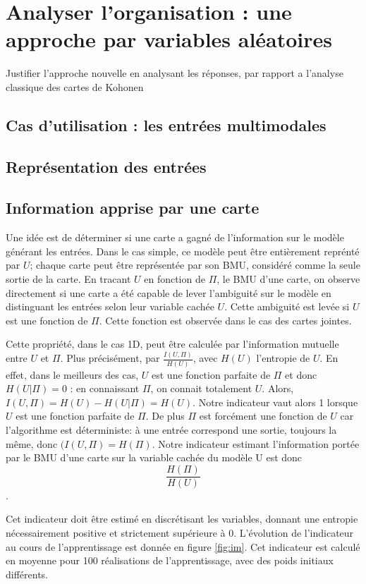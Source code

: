 \chapter{Analyser l'organisation : une approche par variables aléatoires}

Justifier l'approche nouvelle en analysant les réponses, par rapport a l'analyse classique des cartes de Kohonen
\section{Cas d'utilisation : les entrées multimodales}

\section{Représentation des entrées}


\section{Information apprise par une carte}

Une idée est de déterminer si une carte a gagné de l'information sur le modèle générant les entrées. Dans le cas simple, ce modèle peut être entièrement reprénté par $U$; chaque carte peut être représentée par son BMU, considéré comme la seule sortie de la carte. 
En tracant $U$ en fonction de $\Pi$, le BMU d'une carte, on observe directement si une carte a été capable de lever l'ambiguité sur le modèle en distinguant les entrées selon leur variable cachée $U$. Cette ambiguité est levée si $U$ est une fonction de $\Pi$. Cette fonction est observée dans le cas des cartes jointes.

Cette propriété, dans le cas 1D, peut être calculée par l'information mutuelle entre $U$ et $\Pi$. Plus précisément, par $\frac{I(U,\Pi)}{H(U)}$, avec $H(U)$ l'entropie de $U$. 
En effet, dans le meilleurs des cas, $U$ est une fonction parfaite de $\Pi$ et donc $H(U|\Pi ) = 0$ : en connaissant $\Pi$, on connait totalement $U$. Alors, $I(U,\Pi) = H(U) - H(U| \Pi) = H(U)$. 
Notre indicateur vaut alors 1 lorsque $U$ est une fonction parfaite de $\Pi$.
De plus $\Pi$ est forcément une fonction de $U$ car l'algorithme est déterministe: à une entrée correspond une sortie, toujours la même, donc $(I(U, \Pi) = H(\Pi)$. Notre indicateur estimant l'information portée par le BMU d'une carte sur la variable cachée du modèle U est donc $$\frac{H(\Pi)}{H(U)}$$.

Cet indicateur doit être estimé en discrétisant les variables, donnant une entropie nécessairement positive et strictement supérieure à 0.
L'évolution de l'indicateur au cours de l'apprentissage est donnée en figure \ref{fig:im}. Cet indicateur est calculé en moyenne pour 100 réalisations de l'apprentissage, avec des poids initiaux différents. 

